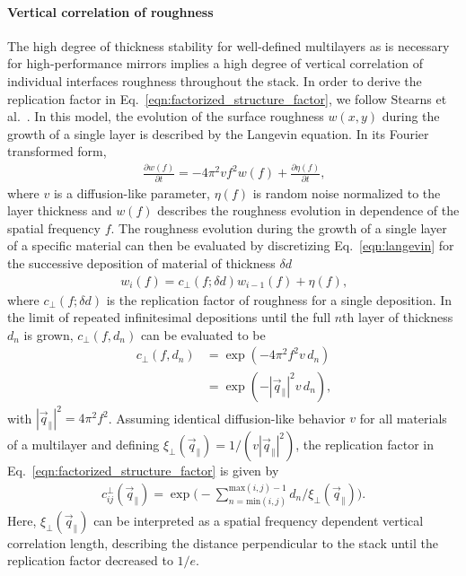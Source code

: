 \paragraph{Vertical correlation of roughness}
The high degree of thickness stability for well-defined multilayers as is necessary for high-performance mirrors implies a high degree of vertical correlation of individual interfaces roughness throughout the stack. In order to derive the replication factor in Eq.~\eqref{eqn:factorized_structure_factor}, we follow Stearns et al.~\cite{stearns_x-ray_1992}. In this model, the evolution of the surface roughness $w(x,y)$ during the growth of a single layer is described by the Langevin equation. In its Fourier transformed form, 
\begin{align}
\frac{\partial w(f)}{\partial t} = - 4 \pi^2 v f^2 w(f) + \frac{\partial \eta(f)}{\partial t} \text{,} \label{eqn:langevin}
\end{align}
where $v$ is a diffusion-like parameter, $\eta(f)$ is random noise normalized to the layer thickness and $w(f)$ describes the roughness evolution in dependence of the spatial frequency $f$. The roughness evolution during the growth of a single layer of a specific material can then be evaluated by discretizing Eq.~\eqref{eqn:langevin} for the successive deposition of material of thickness $\delta d$
\begin{align}
w_i(f) = c_\perp(f;\delta d) w_{i-1}(f) + \eta(f) \text{,}
\end{align}
where $c_\perp(f;\delta d)$ is the replication factor of roughness for a single deposition. In the limit of repeated infinitesimal depositions until the full $n$th layer of thickness $d_n$ is grown, $c_\perp(f,d_n)$ can be evaluated to be \cite{spiller_multilayer_1993}
\begin{align}
    c_\perp(f,d_n) &= \exp(-4\pi^2 f^2 v \,d_n) \nonumber \\
                   &= \exp(-|\vec{q}_\parallel|^2 v \,d_n)\text{,}
\end{align}
with $|\vec{q}_\parallel|^2 = 4 \pi^2 f^2$. Assuming identical diffusion-like behavior $v$ for all materials of a multilayer and defining $\xi_\perp(\vec{q}_\parallel) = 1/(v |\vec{q}_\parallel|^2)$, the replication factor in Eq.~\eqref{eqn:factorized_structure_factor} is given by
\begin{align}
c_{ij}^\perp(\vec{q}_\parallel) =  \exp\Bigg(-\sum \limits_{n = \text{min}(i,j)}^{\text{max}(i,j)-1}d_n/\xi_\perp(\vec{q}_\parallel) \Bigg)\text{.}
\end{align}
Here, $\xi_\perp(\vec{q}_\parallel)$ can be interpreted as a spatial frequency dependent vertical correlation length, describing the distance perpendicular to the stack until the replication factor decreased to $1/e$.


